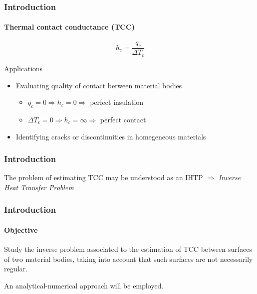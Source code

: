 \documentclass[aspectratio=169]{beamer}
\begin{document}
\begin{frame}
	\frametitle{Introduction}
	\framesubtitle{Thermal contact conductance (TCC)}
	
	\begin{definition}{}
		\begin{equation*}
			h_c = \frac{q_c}{\Delta T_c}
		\end{equation*}
	\end{definition}
	
	\begin{alertblock}{Applications}
		\begin{itemize}
			\item Evaluating quality of contact between material bodies
			\begin{itemize}
				\item $q_c = 0 \Rightarrow h_c = 0 \Rightarrow$ perfect insulation
				\item $\Delta T_c = 0 \Rightarrow h_c = \infty \Rightarrow$ perfect contact
			\end{itemize}
			\item Identifying cracks or discontinuities in homegeneous materials
		\end{itemize}
	\end{alertblock}
\end{frame}
%
%
\begin{frame}
	\frametitle{Introduction}
	
	The problem of estimating TCC may be understood as an IHTP $\Rightarrow$ \textit{Inverse Heat Transfer Problem}
	
\end{frame}
%
\begin{frame}
	\frametitle{Introduction}
	\framesubtitle{Objective}
	\begin{alertblock}{}
		Study the inverse problem associated to the estimation of TCC between surfaces of two material bodies, taking into account that such surfaces are not necessarily regular.
		
		An analytical-numerical approach will be employed.
	\end{alertblock}
	\begin{center}
		
		
	\end{center}
\end{frame}
\end{document}
